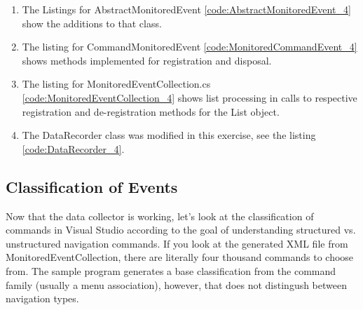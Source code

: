 \begin{enumerate}
\item
The Listings for AbstractMonitoredEvent \ref{code:AbstractMonitoredEvent_4}  show the additions to that class.  
%

\item
The listing for CommandMonitoredEvent \ref{code:MonitoredCommandEvent_4} shows methods implemented for registration and disposal.
%

\item
The listing for MonitoredEventCollection.cs \ref{code:MonitoredEventCollection_4} shows list processing in calls to respective registration and de-registration methods for the List object.
%

\item
The DataRecorder class was modified in this exercise, see the listing \ref{code:DataRecorder_4}.
%
\end{enumerate}

\subsection{Classification of Events}
Now that the data collector is working, let's look at the classification of commands in Visual Studio according to the goal of understanding structured vs. unstructured navigation commands.  If you look at the generated XML file from MonitoredEventCollection, there are literally four thousand commands to choose from.  The sample program generates a base classification from the command family (usually a menu association), however, that does not distingush between navigation types.  

